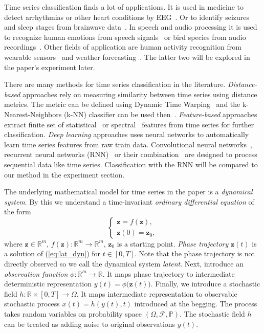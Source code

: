 \documentclass[referee, pdflatex, sn-mathphys-num]{sn-jnl}
\theoremstyle{definition}
\theoremstyle{plain}
\newcommand{\bz}{\ensuremath{\mathbf{z}}}
\begin{document}
		Time series classification finds a lot of applications. It is used in medicine to detect arrhythmias or other heart conditions by EEG~\cite{application_eeg_1}. Or to identify seizures and sleep stages from brainwave data~\cite{application_eeg_2}. In speech and audio processing it is used to recognize human emotions from speech signals~\cite{application_sound_1} or bird species from audio recordings~\cite{application_sound_2}. Other fields of application are human activity recognition from wearable sensors~\cite{application_hac} and weather forecasting~\cite{application_weather}. The latter two will be explored in the paper's experiment later.
		
		There are many methods for time series classification in the literature. \emph{Distance-based} approaches rely on measuring similarity between time series using distance metrics. The metric can be defined using Dynamic Time Warping~\cite{dtw} and the k-Nearest-Neighbors (k-NN) classifier can be used then~\cite{knn_dtw}. \emph{Feature-based} approaches extract finite set of statistical~\cite{stat_feat_1, stat_feat_2} or spectral~\cite{fouirer_feat} features from time series for further classification. \emph{Deep learning} approaches uses neural networks to automatically learn time series features from raw train data. Convolutional neural networks~\cite{application_eeg_1, application_eeg_2}, recurrent neural networks (RNN)~\cite{lstm_feat} or their combination~\cite{application_sound_1, application_hac, application_weather} are designed to process sequential data like time series. Classification with the RNN will be compared to our method in the experiment section.
		
		The underlying mathematical model for time series in the paper is a \emph{dynamical system}. By this we understand a time-invariant \emph{ordinary differential equation} of the form
		\begin{equation}\label{eq:lat_dyn}
			\begin{cases}
				\bz = f(\bz), \\
				\bz(0) = \bz_0,
			\end{cases}
		\end{equation}
		where $\bz \in \mathbb{R}^m$, $f(\bz): \mathbb{R}^m \to \mathbb{R}^m$, $\bz_0$ is a starting point. \textit{Phase trajectory} $\bz(t)$ is a solution of (\ref{eq:lat_dyn}) for $t \in [0, T]$. Note that the phase trajectory is not directly observed so we call the dynamical system \emph{latent}. Next, introduce an \emph{observation function} $\phi: \mathbb{R}^m \to \mathbb{R}$. It maps phase trajectory to intermediate deterministic representation $y(t) = \phi \big( \bz(t) \big)$. Finally, we introduce a stochastic field $h:  \mathbb{R} \times [0, T] \to \Omega$. It maps 
		intermediate representation to observable stochastic process $x(t) = h(y(t), t)$ introduced at the begging. The process takes random variables on probability space $(\Omega, \mathcal{F}, \mathbb{P})$. The stochastic field $h$ can be treated as adding noise to original observations $y(t)$.
		
\end{document}
